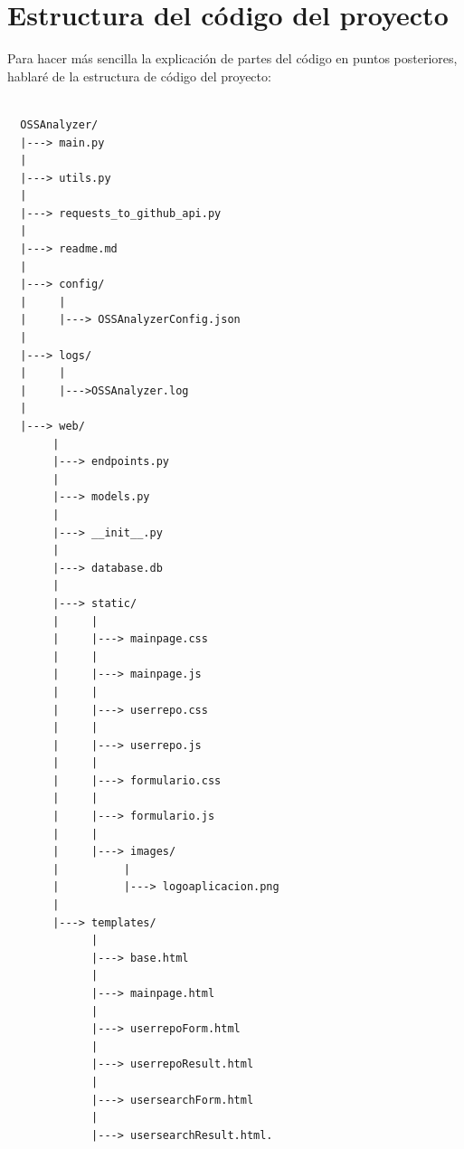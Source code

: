 \documentclass[a4paper, 12pt]{book}
\begin{document}
\section{Estructura del código del proyecto}
\label{sec:Estructura del código del proyecto}

Para hacer más sencilla la explicación de partes del código en puntos posteriores, hablaré de la estructura de código del proyecto:

\begin{verbatim}

  OSSAnalyzer/
  |---> main.py
  |
  |---> utils.py
  |
  |---> requests_to_github_api.py
  |
  |---> readme.md
  |
  |---> config/
  |     |
  |     |---> OSSAnalyzerConfig.json
  |
  |---> logs/     
  |     |  
  |     |--->OSSAnalyzer.log
  |
  |---> web/
       |
       |---> endpoints.py
       |
       |---> models.py
       |
       |---> __init__.py
       |
       |---> database.db
       |
       |---> static/
       |     |
       |     |---> mainpage.css
       |     |
       |     |---> mainpage.js
       |     |
       |     |---> userrepo.css
       |     |
       |     |---> userrepo.js
       |     |
       |     |---> formulario.css
       |     |
       |     |---> formulario.js
       |     | 
       |     |---> images/
       |          |
       |          |---> logoaplicacion.png
       |
       |---> templates/
             |
             |---> base.html
             |
             |---> mainpage.html
             |
             |---> userrepoForm.html
             |
             |---> userrepoResult.html
             |
             |---> usersearchForm.html
             |
             |---> usersearchResult.html.

\end{verbatim}
\end{document}
